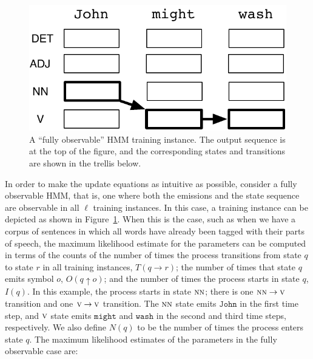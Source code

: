 \begin{figure}[t]
\begin{center}
\vspace{0.2cm}
\includegraphics[scale=0.72]{figures/fig-ch6-q3a.pdf}
\vspace{-0.3cm}
\end{center}\caption{A ``fully observable'' HMM training instance.  The output sequence is at the top of the figure, and the corresponding states and transitions are shown in the trellis below.}\label{chapter6_observable_hmm}
\end{figure}

In order to make the update equations as intuitive as possible,
consider a fully observable HMM, that is, one where both the emissions
and the state sequence are observable in all $\ell$ training
instances.  In this case, a training instance can be depicted as shown
in Figure~\ref{chapter6_observable_hmm}.  When this is the case, such
as when we have a corpus of sentences in which all words have already
been tagged with their parts of speech, the maximum likelihood
estimate for the parameters can be computed in terms of the counts of
the number of times the process transitions from state $q$ to state
$r$ in all training instances, $T(q \rightarrow r)$; the number of
times that state $q$ emits symbol $o$, $O(q \uparrow o)$; and the
number of times the process starts in state $q$, $I(q)$.  In this
example, the process starts in state $\textsc{nn}$; there is one
$\textsc{nn} \rightarrow \textsc{v}$ transition and one $\textsc{v}
\rightarrow \textsc{v}$ transition.  The $\textsc{nn}$ state emits
$\texttt{John}$ in the first time step, and $\textsc{v}$ state emits
$\texttt{might}$ and $\texttt{wash}$ in the second and third time
steps, respectively. We also define $N(q)$ to be the number of times
the process enters state $q$.  The maximum likelihood estimates of the
parameters in the fully observable case are:

